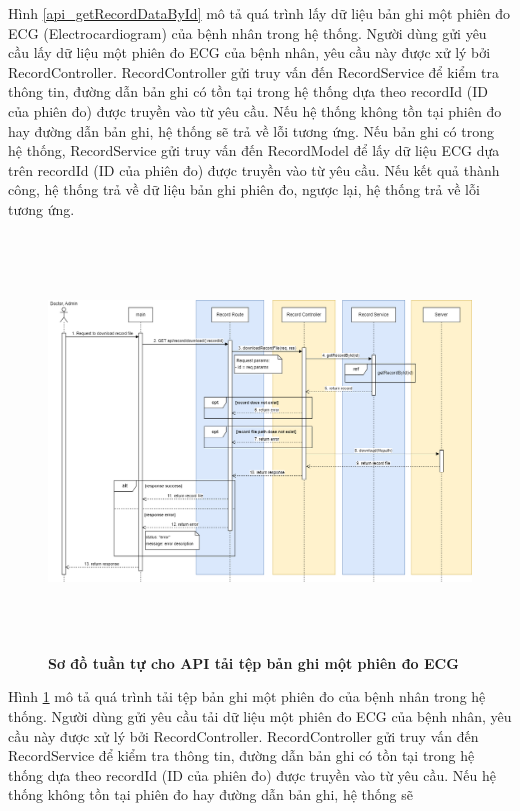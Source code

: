 Hình \ref{api_getRecordDataById} mô tả quá trình lấy dữ liệu bản ghi một phiên đo ECG (Electrocardiogram) của bệnh nhân trong hệ thống. Người dùng gửi yêu cầu lấy dữ liệu một phiên đo ECG của bệnh nhân, 
yêu cầu này được xử lý bởi RecordController. RecordController gửi truy vấn đến RecordService để kiểm tra thông tin, đường dẫn bản ghi có tồn tại trong hệ thống dựa theo recordId (ID của phiên đo) được truyền vào từ yêu cầu. Nếu hệ thống không tồn tại phiên đo hay đường dẫn bản ghi, hệ thống sẽ
trả về lỗi tương ứng. Nếu bản ghi có trong hệ thống, RecordService gửi truy vấn đến RecordModel để lấy dữ liệu ECG dựa trên recordId (ID của phiên đo) được truyền vào từ yêu cầu. 
Nếu kết quả thành công, hệ thống trả về dữ liệu bản ghi phiên đo, ngược lại, hệ thống trả về lỗi tương ứng.

 \begin{figure}[H]
  \centering
  \includegraphics[width=16cm,height=11cm]{Images/sequence_api/downloadRecordDataById.png}
  \caption[Sơ đồ tuần tự cho API tải tệp bản ghi một phiên đo ECG ]{\bfseries \fontsize{12pt}{0pt}
  \selectfont Sơ đồ tuần tự cho API tải tệp bản ghi một phiên đo ECG }
  \label{api_downloadRecordDataById} %
\end{figure}
Hình \ref{api_downloadRecordDataById} mô tả quá trình tải tệp bản ghi một phiên đo của bệnh nhân trong hệ thống. Người dùng gửi yêu cầu tải dữ liệu một phiên đo ECG của bệnh nhân, 
yêu cầu này được xử lý bởi RecordController. RecordController gửi truy vấn đến RecordService để kiểm tra thông tin, đường dẫn bản ghi có tồn tại trong hệ thống dựa theo recordId (ID của phiên đo) được truyền vào từ yêu cầu. Nếu hệ thống không tồn tại phiên đo hay đường dẫn bản ghi, hệ thống sẽ
